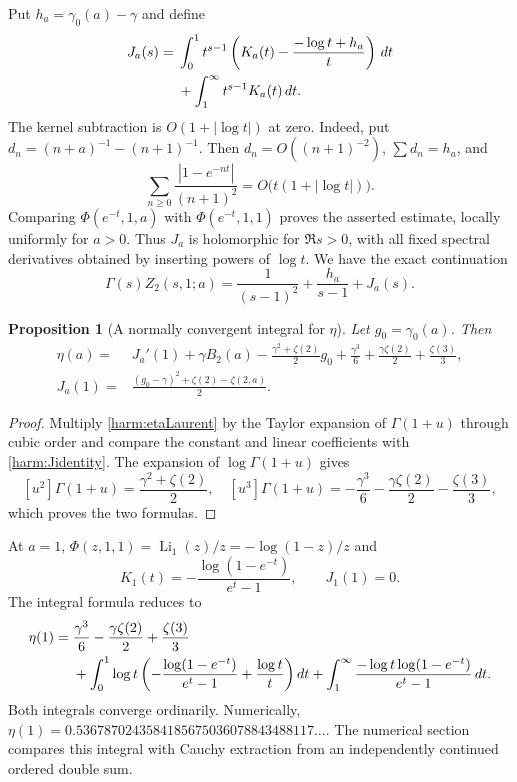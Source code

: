 \documentclass[11pt,letterpaper]{article}
\numberwithin{equation}{section}
\newtheorem{proposition}[theorem]{Proposition}
\theoremstyle{definition}
\theoremstyle{remark}
\DeclareMathOperator{\Li}{Li}
\begin{document}
Put $h_a=\gamma_0(a)-\gamma$ and define
\begin{align}\label{harm:J}
 J_a(s)={}&\int_0^1t^{s-1}
       \left(K_a(t)-\frac{-\log t+h_a}{t}\right)\,dt\notag\\
 &+\int_1^\infty t^{s-1}K_a(t)\,dt.
\end{align}
The kernel subtraction is $O(1+|\log t|)$ at zero. Indeed, put
$d_n=(n+a)^{-1}-(n+1)^{-1}$. Then $d_n=O((n+1)^{-2})$,
$\sum d_n=h_a$, and
\[
 \sum_{n\ge0}\frac{|1-e^{-nt}|}{(n+1)^2}
        =O\bigl(t(1+|\log t|)\bigr).
\]
Comparing $\Phi(e^{-t},1,a)$ with $\Phi(e^{-t},1,1)$ proves the
asserted estimate, locally uniformly for $a>0$.
Thus $J_a$ is holomorphic for
$\Re s>0$, with all fixed spectral derivatives obtained by inserting
powers of $\log t$. We have the exact continuation
\begin{equation}\label{harm:Jidentity}
 \Gamma(s)Z_2(s,1;a)=\frac1{(s-1)^2}+
                 \frac{h_a}{s-1}+J_a(s).
\end{equation}

\begin{proposition}[A normally convergent integral for $\eta$]
\label{harm:etaIntegral}
Let $g_0=\gamma_0(a)$. Then
\begin{align}\label{harm:etaintegral}
 \eta(a)={}&J_a'(1)+\gamma B_2(a)
 -\frac{\gamma^2+\zeta(2)}2g_0
 +\frac{\gamma^3}6+\frac{\gamma\zeta(2)}2+\frac{\zeta(3)}3,\\
 J_a(1)={}&\frac{(g_0-\gamma)^2+\zeta(2)-\zeta(2,a)}2.\label{harm:Jone}
\end{align}
\end{proposition}
\begin{proof}
Multiply \eqref{harm:etaLaurent} by the Taylor expansion of
$\Gamma(1+u)$ through cubic order and compare the constant and linear
coefficients with \eqref{harm:Jidentity}. The expansion of
$\log\Gamma(1+u)$ gives
\[
 [u^2]\Gamma(1+u)=\frac{\gamma^2+\zeta(2)}2,\quad
 [u^3]\Gamma(1+u)=-\frac{\gamma^3}6-
                  \frac{\gamma\zeta(2)}2-\frac{\zeta(3)}3,
\]
which proves the two formulas.
\end{proof}

At $a=1$, $\Phi(z,1,1)=\Li_1(z)/z=-\log(1-z)/z$ and
\[
 K_1(t)=-\frac{\log(1-e^{-t})}{e^t-1},\qquad J_1(1)=0.
\]
The integral formula reduces to
\begin{align}\label{harm:etaone}
 \eta(1)={}&\frac{\gamma^3}6-\frac{\gamma\zeta(2)}2+
                \frac{\zeta(3)}3\notag\\
 &+\int_0^1\log t\left(
      -\frac{\log(1-e^{-t})}{e^t-1}+\frac{\log t}{t}\right)dt
 +\int_1^\infty\frac{-\log t\log(1-e^{-t})}{e^t-1}\,dt.
\end{align}
Both integrals converge ordinarily. Numerically,
$\eta(1)=0.5367870243584185675036078843488117\ldots$.
The numerical section compares this integral with Cauchy extraction
from an independently continued ordered double sum.
\end{document}
